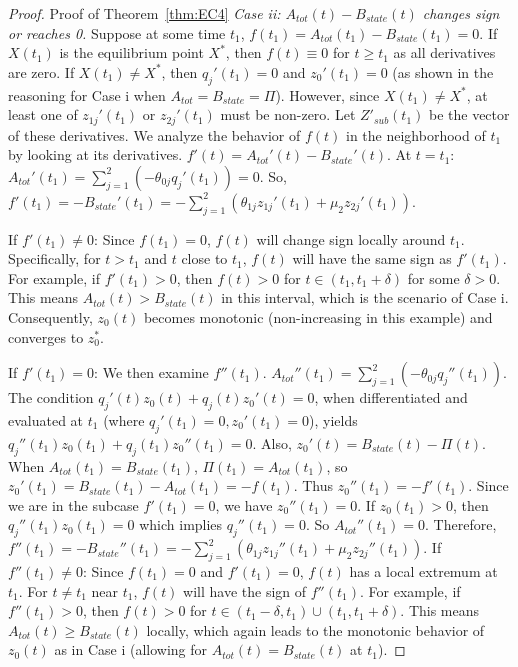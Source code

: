 \begin{proof}{Proof of Theorem~\ref{thm:EC4}}
 \textit{Case ii: $A_{tot}(t) - B_{state}(t)$ changes sign or reaches 0.}
    Suppose at some time $t_1$, $f(t_1) = A_{tot}(t_1) - B_{state}(t_1) = 0$.
    If $X(t_1)$ is the equilibrium point $X^*$, then $f(t) \equiv 0$ for $t \ge t_1$ as all derivatives 
    are zero.
    If $X(t_1) \neq X^*$, then $q_j'(t_1)=0$ and $z_0'(t_1)=0$ (as shown in the reasoning for Case i 
    when $A_{tot}=B_{state}=\Pi$). However, since $X(t_1) \neq X^*$, at least one of $z_{1j}'(t_1)$ 
    or $z_{2j}'(t_1)$ must be non-zero. Let $Z'_{sub}(t_1)$ be the vector of these derivatives.
    We analyze the behavior of $f(t)$ in the neighborhood of $t_1$ by looking at its derivatives.
    $f'(t) = A_{tot}'(t) - B_{state}'(t)$. At $t=t_1$:
    $A_{tot}'(t_1) = \sum_{j=1}^{2} (-\theta_{0j}q_j'(t_1)) = 0$.
    So, $f'(t_1) = -B_{state}'(t_1) = -\sum_{j=1}^{2}(\theta_{1j}z_{1j}'(t_1) + \mu_2z_{2j}'(t_1))$.

    If $f'(t_1) \neq 0$: Since $f(t_1)=0$, $f(t)$ will change sign locally around $t_1$.
    Specifically, for $t > t_1$ and $t$ close to $t_1$, $f(t)$ will have the same sign as $f'(t_1)$.
    For example, if $f'(t_1) > 0$, then $f(t) > 0$ for $t \in (t_1, t_1+\delta)$ for some $\delta > 0$.
    This means $A_{tot}(t) > B_{state}(t)$ in this interval, which is the scenario of Case i.
    Consequently, $z_0(t)$ becomes monotonic (non-increasing in this example) and converges to $z_0^*$.

    If $f'(t_1) = 0$: We then examine $f''(t_1)$.
    $A_{tot}''(t_1) = \sum_{j=1}^{2} (-\theta_{0j}q_j''(t_1))$.
    The condition $q_j'(t)z_0(t) + q_j(t)z_0'(t) = 0$, when differentiated and evaluated at $t_1$ (where $q_j'(t_1)=0, z_0'(t_1)=0$), yields $q_j''(t_1)z_0(t_1) + q_j(t_1)z_0''(t_1) = 0$.
    Also, $z_0'(t) = B_{state}(t) - \Pi(t)$. When $A_{tot}(t_1)=B_{state}(t_1)$, $\Pi(t_1)=A_{tot}(t_1)$,
    so $z_0'(t_1) = B_{state}(t_1) - A_{tot}(t_1) = -f(t_1)$.
    Thus $z_0''(t_1) = -f'(t_1)$. Since we are in the subcase $f'(t_1)=0$, we have $z_0''(t_1)=0$.
    If $z_0(t_1) > 0$, then $q_j''(t_1)z_0(t_1)=0$ which implies $q_j''(t_1)=0$. So $A_{tot}''(t_1)=0$.
    Therefore, $f''(t_1) = -B_{state}''(t_1) = -\sum_{j=1}^{2}(\theta_{1j}z_{1j}''(t_1) + \mu_2z_{2j}''(t_1))$.
    If $f''(t_1) \neq 0$: Since $f(t_1)=0$ and $f'(t_1)=0$, $f(t)$ has a local extremum at $t_1$.
    For $t \neq t_1$ near $t_1$, $f(t)$ will have the sign of $f''(t_1)$.
    For example, if $f''(t_1) > 0$, then $f(t) > 0$ for $t \in (t_1-\delta, t_1) \cup (t_1, t_1+\delta)$.
    This means $A_{tot}(t) \ge B_{state}(t)$ locally, which again leads to the monotonic behavior of $z_0(t)$ as in Case i (allowing for $A_{tot}(t)=B_{state}(t)$ at $t_1$).


\end{proof}
